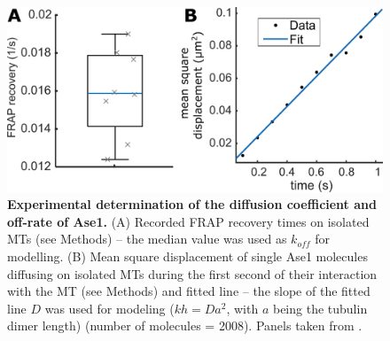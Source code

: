 \begin{figure}[h!]
{        }\label{ase2d}
\end{figure}

\begin{figure}
    \centering
    \includegraphics[width=1\linewidth]{Figures/ase2FRAP.png}
    \caption[Experimental determination of the diffusion coefficient and off-rate of Ase1.]{\textbf{Experimental determination of the diffusion coefficient and off-rate of Ase1.}
    (A) Recorded FRAP recovery times on isolated MTs (see Methods) – the median value was used as $k_{off}$ for modelling. (B) Mean square displacement of single Ase1 molecules diffusing on isolated MTs during the first second of their interaction with the MT (see Methods) and fitted line – the slope of the fitted line $D$ was used for modeling ($kh = Da^2$, with $a$ being the tubulin dimer length) (number of molecules = 2008). Panels taken from \cite{Krattenmacher2024}.
        }\label{ase2FRAP}
\end{figure}

